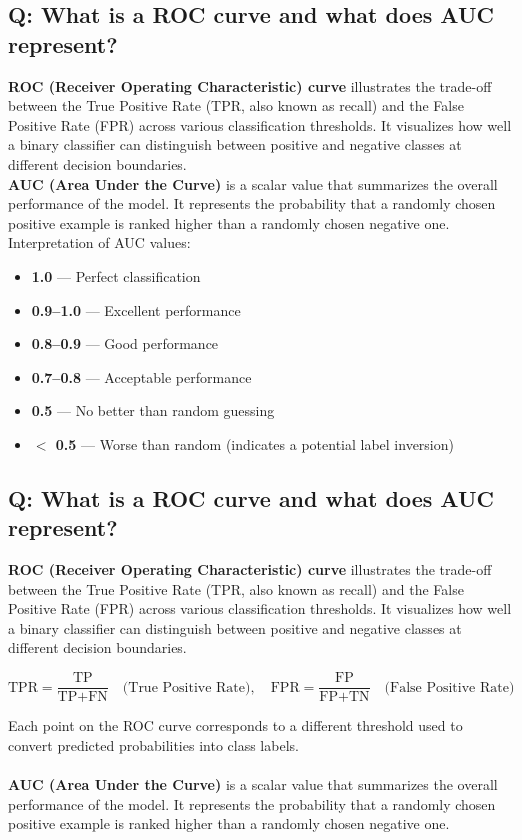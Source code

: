 \documentclass[11pt]{article}
\begin{document}
\subsection*{Q: What is a ROC curve and what does AUC represent?}
\textbf{ROC (Receiver Operating Characteristic) curve} illustrates the trade-off between the True Positive Rate (TPR, also known as recall) and the False Positive Rate (FPR) across various classification thresholds. It visualizes how well a binary classifier can distinguish between positive and negative classes at different decision boundaries. \\
\textbf{AUC (Area Under the Curve)} is a scalar value that summarizes the overall performance of the model. It represents the probability that a randomly chosen positive example is ranked higher than a randomly chosen negative one. Interpretation of AUC values:
\begin{itemize}
	\item \textbf{1.0} — Perfect classification
	\item \textbf{0.9–1.0} — Excellent performance
	\item \textbf{0.8–0.9} — Good performance
	\item \textbf{0.7–0.8} — Acceptable performance
	\item \textbf{0.5} — No better than random guessing
	\item \textbf{$<$ 0.5} — Worse than random (indicates a potential label inversion)
\end{itemize}

\subsection*{Q: What is a ROC curve and what does AUC represent?}
\textbf{ROC (Receiver Operating Characteristic) curve} illustrates the trade-off between the True Positive Rate (TPR, also known as recall) and the False Positive Rate (FPR) across various classification thresholds. It visualizes how well a binary classifier can distinguish between positive and negative classes at different decision boundaries.

\[
	\text{TPR} = \frac{\text{TP}}{\text{TP} + \text{FN}} \quad \text{(True Positive Rate)}, \quad
	\text{FPR} = \frac{\text{FP}}{\text{FP} + \text{TN}} \quad \text{(False Positive Rate)}
\]

Each point on the ROC curve corresponds to a different threshold used to convert predicted probabilities into class labels. \\ \\
\textbf{AUC (Area Under the Curve)} is a scalar value that summarizes the overall performance of the model. It represents the probability that a randomly chosen positive example is ranked higher than a randomly chosen negative one.
\end{document}
